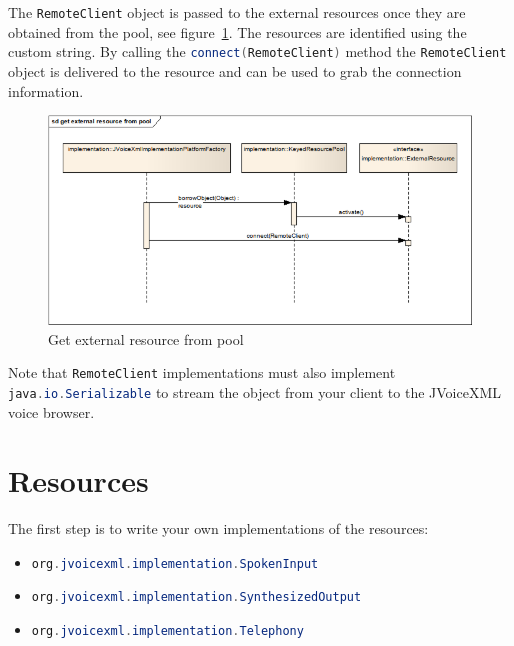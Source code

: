\documentclass[11pt,a4paper]{book}
\begin{document}
The \lstinline[language=Java]{RemoteClient} object is passed to the external
resources once they are obtained from the pool, see
figure~\ref{fig:get-external-resource-from-pool}. The resources are identified
using the custom string. By calling the
\lstinline[language=Java]{connect(RemoteClient)} method the
\lstinline[language=Java]{RemoteClient} object is delivered to the resource and
can be used to grab the connection information.
\begin{figure}[htp]
\begin{center}
  \includegraphics[width=\linewidth]{sd-get-external-resource-from-pool}
  \caption{Get external resource from pool}
  \label{fig:get-external-resource-from-pool}
\end{center}
\end{figure}

Note that \lstinline[language=Java]{RemoteClient} implementations must also
implement \lstinline[language=Java]{java.io.Serializable} to stream the object
from your client to the JVoiceXML voice browser.

\section{Resources}

The first step is to write your own implementations of the resources:
\begin{itemize}
  \item \lstinline[language=Java]{org.jvoicexml.implementation.SpokenInput}
  \item
  \lstinline[language=Java]{org.jvoicexml.implementation.SynthesizedOutput}
  \item \lstinline[language=Java]{org.jvoicexml.implementation.Telephony}
\end{itemize}
\end{document}
